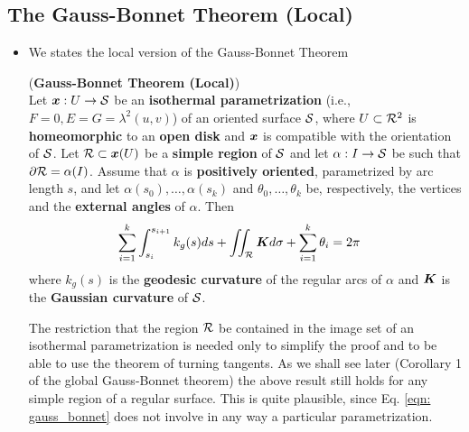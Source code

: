 \documentclass[11pt]{article}
\begin{document}
\subsection{The Gauss-Bonnet Theorem (Local)}
\begin{itemize}
\item We states the local version of the Gauss-Bonnet Theorem
\begin{theorem}\label{thm: gauss_bonnet_local}  (\textbf{Gauss-Bonnet Theorem (Local)}) \citep{do1976differential}\\
Let $\boldsymbol{x}: U \rightarrow {\mathcal S}$ be an \textbf{isothermal parametrization} (i.e., $F = 0, E = G = \lambda^2(u, v)$) of an oriented surface ${\mathcal S}$, where $U \subset {\mathcal R}^2$ is \textbf{homeomorphic} to an \textbf{open disk} and $\boldsymbol{x}$ is compatible with the orientation of ${\mathcal S}$. Let ${\mathcal R} \subset \boldsymbol{x}(U)$ be a \textbf{simple region} of ${\mathcal S}$ and let $\alpha: I \rightarrow {\mathcal S}$ be such that  $\partial {\mathcal R} = \alpha(I)$. Assume that $\alpha$ is \textbf{positively oriented}, parametrized by arc length $s$, and let $\alpha(s_0),\ldots, \alpha(s_k)$ and $\theta_0,\ldots,\theta_k$ be, respectively, the vertices and the \textbf{external angles} of $\alpha$. Then
\begin{align}
\sum_{i=1}^{k}\int_{s_{i}}^{s_{i+1}}k_{g}(s)ds + \iint_{{\mathcal R}}\boldsymbol{K}d\sigma + \sum_{i=1}^{k}\theta_{i} &= 2\pi \label{eqn: gauss_bonnet}
\end{align} where $k_g(s)$ is the \textbf{geodesic curvature} of the regular arcs of $\alpha$ and $\boldsymbol{K}$ is the
\textbf{Gaussian curvature} of ${\mathcal S}$.
\end{theorem}

\begin{remark}
The restriction that the region ${\mathcal R}$ be contained in the image set of an isothermal parametrization is needed only to simplify the proof and to be able to use the theorem of turning tangents. As we shall see later (Corollary 1 of the global Gauss-Bonnet theorem) the above result still holds for any simple region of a regular surface. This is quite plausible, since Eq. \eqref{eqn: gauss_bonnet} does not involve in any way a particular parametrization. \citep{do1976differential}
\end{remark}


\end{itemize}
\end{document}
